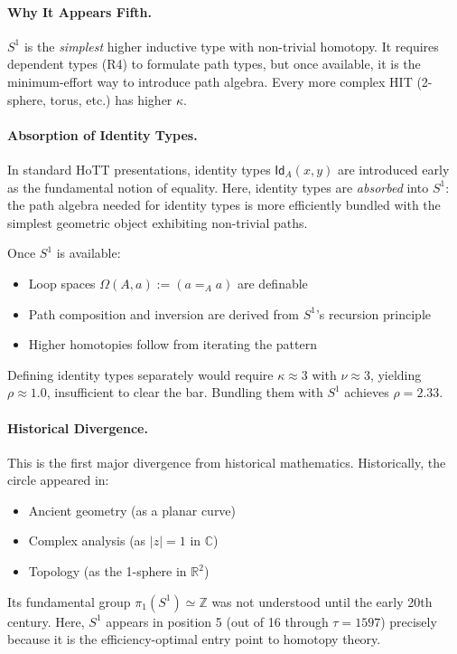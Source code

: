 \documentclass[11pt]{article}
\theoremstyle{definition}
\begin{document}
\paragraph{Why It Appears Fifth.}
$S^1$ is the \emph{simplest} higher inductive type with non-trivial homotopy. It requires dependent types (R4) to formulate path types, but once available, it is the minimum-effort way to introduce path algebra. Every more complex HIT (2-sphere, torus, etc.) has higher $\kappa$.

\paragraph{Absorption of Identity Types.}
In standard HoTT presentations, identity types $\mathsf{Id}_A(x, y)$ are introduced early as the fundamental notion of equality. Here, identity types are \emph{absorbed} into $S^1$: the path algebra needed for identity types is more efficiently bundled with the simplest geometric object exhibiting non-trivial paths.

Once $S^1$ is available:
\begin{itemize}
\item Loop spaces $\Omega(A, a) := (a =_A a)$ are definable
\item Path composition and inversion are derived from $S^1$'s recursion principle
\item Higher homotopies follow from iterating the pattern
\end{itemize}

Defining identity types separately would require $\kappa \approx 3$ with $\nu \approx 3$, yielding $\rho \approx 1.0$, insufficient to clear the bar. Bundling them with $S^1$ achieves $\rho = 2.33$.

\paragraph{Historical Divergence.}
This is the first major divergence from historical mathematics. Historically, the circle appeared in:
\begin{itemize}
\item Ancient geometry (as a planar curve)
\item Complex analysis (as $|z| = 1$ in $\mathbb{C}$)  
\item Topology (as the 1-sphere in $\mathbb{R}^2$)
\end{itemize}

Its fundamental group $\pi_1(S^1) \simeq \mathbb{Z}$ was not understood until the early 20th century. Here, $S^1$ appears in position 5 (out of 16 through $\tau=1597$) precisely because it is the efficiency-optimal entry point to homotopy theory.
\end{document}
